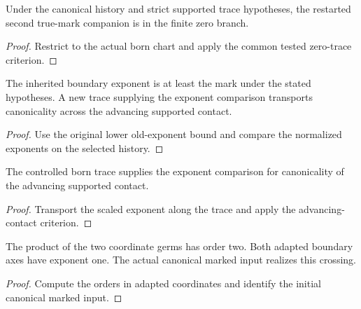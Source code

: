 \begin{theorem}
\label{hir:g1-restarted-second-companion-zero}
\leanok
Under the canonical history and strict supported trace hypotheses, the restarted second true-mark companion is in the finite zero branch.
\end{theorem}
\begin{proof}
Restrict to the actual born chart and apply the common tested zero-trace criterion.
\end{proof}

\begin{theorem}
\label{hir:g1-advancing-supported-contact-exponents}
\leanok
The inherited boundary exponent is at least the mark under the stated hypotheses. A new trace supplying the exponent comparison transports canonicality across the advancing supported contact.
\end{theorem}
\begin{proof}
Use the original lower old-exponent bound and compare the normalized exponents on the selected history.
\end{proof}

\begin{theorem}
\label{hir:g1-advancing-born-controlled-trace}
\leanok
The controlled born trace supplies the exponent comparison for canonicality of the advancing supported contact.
\end{theorem}
\begin{proof}
Transport the scaled exponent along the trace and apply the advancing-contact criterion.
\end{proof}

\begin{theorem}
\label{hir:g1-native-crossing-ideal}
\leanok
The product of the two coordinate germs has order two. Both adapted boundary axes have exponent one. The actual canonical marked input realizes this crossing.
\end{theorem}
\begin{proof}
Compute the orders in adapted coordinates and identify the initial canonical marked input.
\end{proof}

